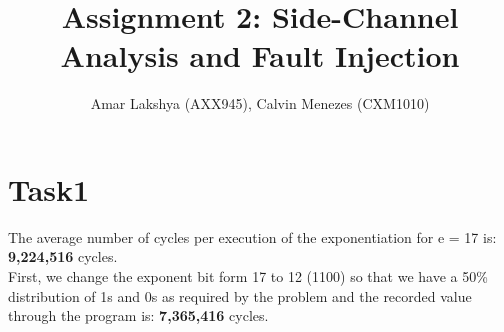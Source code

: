 \documentclass[1p,16pt]{elsarticle}
\begin{document}
\begin{frontmatter}



\title{Assignment 2: Side-Channel Analysis and Fault Injection}


\author{Amar Lakshya (AXX945), Calvin Menezes (CXM1010)}

\address{School of Computer Science, University of Birmingham}

%
%
%
%
\end{frontmatter}


\section{Task1}
The average number of cycles per execution of the exponentiation for e = 17 is:
\textbf{9,224,516} cycles.
\\
First, we change the exponent bit form 17 to 12 (1100) so that we have a 50\%
distribution of 1s and 0s as required by the problem and the recorded value
through the program is: \textbf{7,365,416} cycles.\\
\end{document}
